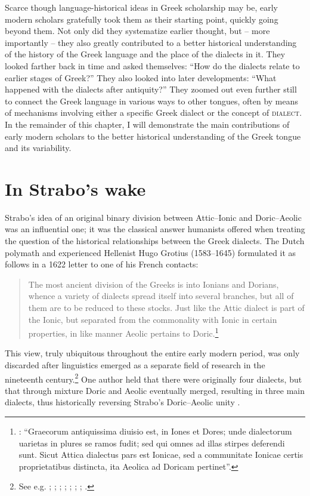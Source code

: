 Scarce though language-historical ideas in Greek scholarship may be, early modern scholars gratefully took them as their starting point, quickly going beyond them. Not only did they systematize earlier thought, but – more importantly – they also greatly contributed to a better historical understanding of the history of the Greek language and the place of the dialects in it. They looked farther back in time and asked themselves: “How do the dialects relate to earlier stages of Greek?” They also looked into later developments: “What happened with the dialects after antiquity?” They zoomed out even further still to connect the Greek language in various ways to other tongues, often by means of mechanisms involving either a specific Greek dialect or the concept of \textsc{dialect}. In the remainder of this chapter, I will demonstrate the main contributions of early modern scholars to the better historical understanding of the Greek tongue and its variability.

\section{In Strabo’s wake}\label{sec:5.2}

Strabo’s idea of an original binary division between Attic–Ionic and Doric–Aeolic was an influential one; it was the classical answer humanists offered when treating the question of the historical relationships between the Greek dialects. The Dutch polymath and experienced Hellenist Hugo Grotius (1583–1645) formulated it as follows in a 1622 letter to one of his French contacts:

\begin{quote}
The most ancient division of the Greeks is into Ionians and Dorians, whence a variety of dialects spread itself into several branches, but all of them are to be reduced to these stocks. Just like the Attic dialect is part of the Ionic, but separated from the commonality with Ionic in certain properties, in like manner Aeolic pertains to Doric.\footnote{\citet[143]{Grotius1648}: “Graecorum antiquissima diuisio est, in Iones et Dores; unde dialectorum uarietas in plures se ramos fudit; sed qui omnes ad illas stirpes deferendi sunt. Sicut Attica dialectus pars est Ionicae, sed a communitate Ionicae certis proprietatibus distincta, ita Aeolica ad Doricam pertinet”.}
\end{quote}

This view, truly ubiquitous throughout the entire early modern period, was only discarded after linguistics emerged as a separate field of research in the nineteenth century.\footnote{See e.g. \citet[64\textsc{\textsuperscript{r}}]{Sabellicus1490}; \citet[235]{Estienne1573}; \citet[563]{Lancelot1655}; \citet[\textsc{c.2}\textsc{\textsuperscript{r}}–\textsc{c.2}\textsc{\textsuperscript{v}}]{Schwartz1702}; \citet[i]{Maittaire1706}; \citet[82]{Vitringa1712}; \citet[\textsc{xv}]{Castelli1769}; \citet[\textsc{a.2}\textsc{\textsuperscript{r}}]{Hauptmann1776}.} One author held that there were originally four dialects, but that through mixture Doric and Aeolic eventually merged, resulting in three main dialects, thus historically reversing Strabo’s Doric–Aeolic unity \citep[20]{Gedike1782}.

